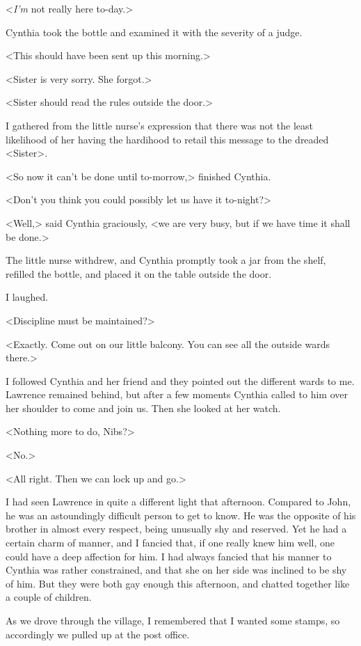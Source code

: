  <\emph{I'm} not really here to-day.> 

 Cynthia took the bottle and examined it with the severity of a judge. 

 <This should have been sent up this morning.> 

 <Sister is very sorry. She forgot.> 

 <Sister should read the rules outside the door.> 

 I gathered from the little nurse's expression that there was not the least likelihood of her having the hardihood to retail this message to the dreaded <Sister>. 

 <So now it can't be done until to-morrow,> finished Cynthia. 

 <Don't you think you could possibly let us have it to-night?> 

 <Well,> said Cynthia graciously, <we are very busy, but if we have time it shall be done.> 

 The little nurse withdrew, and Cynthia promptly took a jar from the shelf, refilled the bottle, and placed it on the table outside the door. 

 I laughed. 

 <Discipline must be maintained?> 

 <Exactly. Come out on our little balcony. You can see all the outside wards there.> 

 I followed Cynthia and her friend and they pointed out the different wards to me. Lawrence remained behind, but after a few moments Cynthia called to him over her shoulder to come and join us. Then she looked at her watch. 

 <Nothing more to do, Nibs?> 

 <No.> 

 <All right. Then we can lock up and go.> 

 I had seen Lawrence in quite a different light that afternoon. Compared to John, he was an astoundingly difficult person to get to know. He was the opposite of his brother in almost every respect, being unusually shy and reserved. Yet he had a certain charm of manner, and I fancied that, if one really knew him well, one could have a deep affection for him. I had always fancied that his manner to Cynthia was rather constrained, and that she on her side was inclined to be shy of him. But they were both gay enough this afternoon, and chatted together like a couple of children. 

 As we drove through the village, I remembered that I wanted some stamps, so accordingly we pulled up at the post office. 

